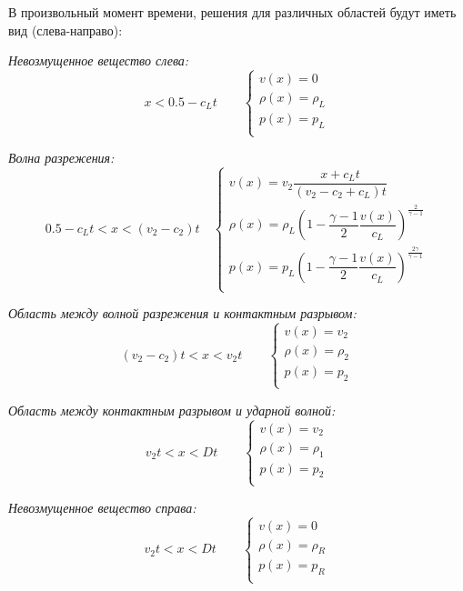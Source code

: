 \documentclass[a4paper]{article}
\begin{document}
	В произвольный момент времени, решения для различных областей будут иметь вид (слева-направо):
	
	\textit{Невозмущенное вещество слева:}
	\begin{equation}
		x < 0.5 - c_L t		\qquad
		\begin{cases}
		v (x)		=	0		\\
		\rho (x)	=	\rho_L	\\
		p (x)		=	p_L		\\
		\end{cases}
	\end{equation}
	
	\textit{Волна разрежения:}
	\begin{equation}
	0.5 - c_L t	<	x	<	(v_2 - c_2)t		\quad
	\begin{cases}
	v (x)		=	v_2 \dfrac{x + c_L t}{(v_2 - c_2 + c_L)t}		\\
	\rho (x)	=	\rho_L \left(1 - \dfrac{\gamma - 1}{2} \dfrac{v(x)}{c_L}\right)^{\frac{2}{\gamma -1}}	\\
	p (x)		=	p_L \left(1 - \dfrac{\gamma - 1}{2} \dfrac{v(x)}{c_L}\right)^{\frac{2\gamma}{\gamma -1}}	\\
	\end{cases}
	\end{equation}
	
	\textit{Область между волной разрежения и контактным разрывом:}
	\begin{equation}
	(v_2 - c_2) t <	x < v_2 t		\qquad
	\begin{cases}
	v (x)		=	v_2		\\
	\rho (x)	=	\rho_2	\\
	p (x)		=	p_2		\\
	\end{cases}
	\end{equation}
	
	\textit{Область между контактным разрывом и ударной волной:}
	\begin{equation}
	v_2 t <	x < D t		\qquad
	\begin{cases}
	v (x)		=	v_2		\\
	\rho (x)	=	\rho_1	\\
	p (x)		=	p_2		\\
	\end{cases}
	\end{equation}
	
	\textit{Невозмущенное вещество справа:}
	\begin{equation}
	v_2 t <	x < D t		\qquad
	\begin{cases}
	v (x)		=	0		\\
	\rho (x)	=	\rho_R	\\
	p (x)		=	p_R		\\
	\end{cases}
	\end{equation}
	
\end{document}
